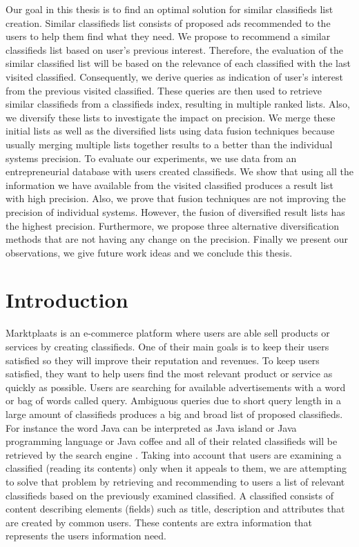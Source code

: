 \abstract

Our goal in this thesis is to find an optimal solution for similar classifieds list creation. Similar classifieds list consists of proposed ads recommended to the users to help them find what they need. We propose to recommend a similar classifieds list based on user's previous interest. Therefore, the evaluation of the similar classified list will be based on the relevance of each classified with the last visited classified. Consequently, we derive queries as indication of user's interest from the previous visited classified. These queries are then used to retrieve similar classifieds from a classifieds index, resulting in multiple ranked lists. Also, we diversify these lists to investigate the impact on precision. We merge these initial lists as well as the diversified lists using data fusion techniques because usually merging multiple lists together results to a better than the individual systems precision. To evaluate our experiments, we use data from an entrepreneurial database with users created classifieds. We show that using all the information we have available from the visited classified produces a result list with high precision. Also, we prove that fusion techniques are not improving the precision of individual systems. However, the fusion of diversified result lists has the highest precision. Furthermore, we propose three alternative diversification methods that are not having any change on the precision. Finally we present our observations, we give future work ideas and we conclude this thesis.


\newpage
\tableofcontents


\chapter{Introduction}


Marktplaats is an e-commerce platform where users are able sell products or services by creating classifieds. One of their main goals is to keep their users satisfied so they will improve their reputation and revenues. To keep users satisfied, they want to help users find the most relevant product or service as quickly as possible. Users are searching for available advertisements with a word or bag of words called query. Ambiguous queries due to short query length in a large amount of classifieds produces a big and broad list of proposed classifieds. For instance the word Java can be interpreted as Java island or Java programming language or Java coffee and all of their related classifieds will be retrieved by the search engine \cite{RoulSahay}. Taking into account that users are examining a classified (reading its contents) only when it appeals to them, we are attempting to solve that problem by retrieving and recommending to users a list of relevant classifieds based on the previously examined classified. A classified consists of content describing elements (fields) such as title, description and attributes that are created by common users. These contents are extra information that represents the users information need.

